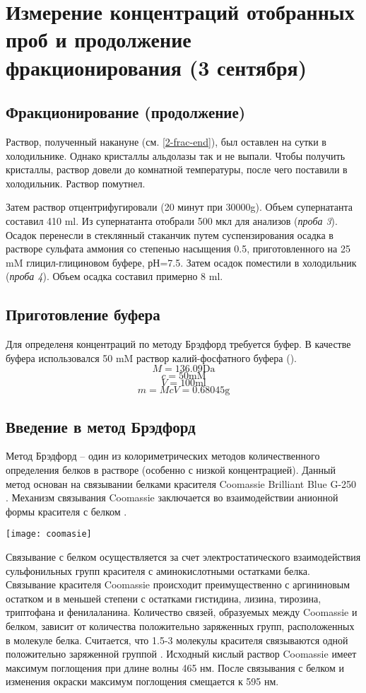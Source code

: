 \section{Измерение концентраций отобранных проб и продолжение фракционирования (3 сентября)}

\subsection{Фракционирование (продолжение)}
Раствор, полученный накануне (см. \ref{2-frac-end}), был оставлен на сутки в холодильнике.
Однако кристаллы альдолазы так и не выпали.
Чтобы получить кристаллы, раствор довели до комнатной температуры,
после чего поставили в холодильник. Раствор помутнел.

Затем раствор отцентрифугировали (20 минут при 30000g).
Объем супернатанта составил 410 ml.
Из супернатанта отобрали 500 мкл для анализов (\emph{проба 3}).
Осадок перенесли в стеклянный стаканчик путем суспензирования осадка
в растворе сульфата аммония со степенью насыщения 0.5,
приготовленного на 25 mM глицил-глициновом буфере, рН=7.5.
Затем осадок поместили в холодильник (\emph{проба 4}).
Объем осадка составил примерно 8 ml.

\subsection{Приготовление буфера}
Для определеня концентраций по методу Брэдфорд требуется буфер.
В качестве буфера использовался 50 mM раствор калий-фосфатного буфера ().
$$ M = 136.09 \text{Da} $$
$$ c = 50 \text{mM} $$
$$ V = 100 \text{ml} $$
$$ m = McV = 0.68045 \text{g} $$

\subsection{Введение в метод Брэдфорд}
Метод Брэдфорд -- один из колориметрических методов количественного определения белков в растворе
(особенно с низкой концентрацией).
Данный метод основан на связывании белками красителя Coomassie Brilliant Blue G-250 \cite{bradford-1}.
Механизм связывания Coomassie заключается во взаимодействии анионной формы красителя с белком \cite{bradford-2}.

\texttt{[image: coomasie]}

Связывание с белком осуществляется за счет электростатического взаимодействия сульфонильных групп
красителя с аминокислотными остатками белка.
Связывание красителя Coomassie происходит преимущественно с аргининовым остатком и в меньшей степени с
остатками гистидина, лизина, тирозина, триптофана и фенилаланина.
Количество связей, образуемых между Coomassie и белком, зависит от количества положительно заряженных групп,
расположенных в молекуле белка.
Считается, что 1.5-3 молекулы красителя связываются одной положительно заряженной группой \cite{bradford-3}.
Исходный кислый раствор Coomassie имеет максимум поглощения при длине волны 465 нм.
После связывания с белком и изменения окраски максимум поглощения смещается к 595 нм.

